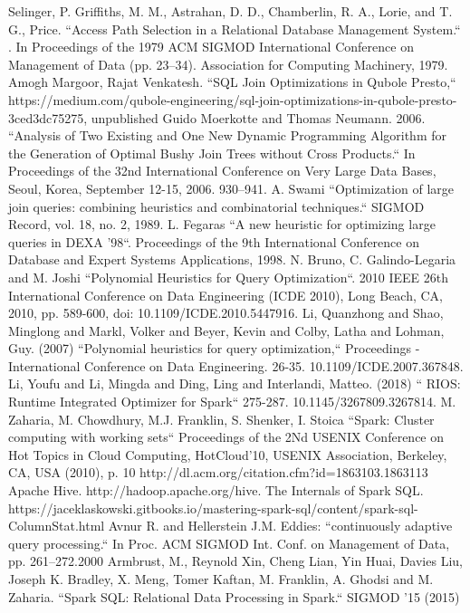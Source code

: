 \documentclass[conference]{IEEEtran}
\begin{document}
\begin{thebibliography}{00}
 Selinger, P. Griffiths, M. M., Astrahan, D. D., Chamberlin, R. A., Lorie, and T. G., Price. ``Access Path Selection in a Relational Database Management System.`` . In Proceedings of the 1979 ACM SIGMOD International Conference on Management of Data (pp. 23–34). Association for Computing Machinery, 1979.
 Amogh Margoor, Rajat Venkatesh. ``SQL Join Optimizations in Qubole Presto,``
https://medium.com/qubole-engineering/sql-join-optimizations-in-qubole-presto-3ced3dc75275, unpublished
 Guido Moerkotte and Thomas Neumann. 2006. ``Analysis of Two Existing and One New Dynamic Programming Algorithm for the Generation of Optimal Bushy Join Trees without Cross Products.`` In Proceedings of the 32nd International Conference on Very Large Data Bases, Seoul, Korea, September 12-15, 2006. 930–941.
 A. Swami ``Optimization of large join queries: combining heuristics and
combinatorial techniques.`` SIGMOD Record, vol. 18, no. 2, 1989.
 L. Fegaras ``A new heuristic for optimizing large queries in DEXA ’98``. Proceedings of the 9th International Conference on Database and Expert Systems Applications, 1998.
 N. Bruno, C. Galindo-Legaria and M. Joshi ``Polynomial Heuristics for Query Optimization``. 2010 IEEE 26th International Conference on Data Engineering (ICDE 2010), Long Beach, CA, 2010, pp. 589-600, doi: 10.1109/ICDE.2010.5447916.
 Li, Quanzhong and Shao, Minglong and Markl, Volker and Beyer, Kevin and Colby, Latha and Lohman, Guy. (2007)  ``Polynomial heuristics for query optimization,`` Proceedings - International Conference on Data Engineering. 26-35. 10.1109/ICDE.2007.367848.
 Li, Youfu and Li, Mingda and Ding, Ling and Interlandi, Matteo. (2018)  `` RIOS: Runtime Integrated Optimizer for Spark`` 275-287. 10.1145/3267809.3267814.
 M. Zaharia, M. Chowdhury, M.J. Franklin, S. Shenker, I. Stoica
``Spark: Cluster computing with working sets`` Proceedings of the 2Nd USENIX Conference on Hot Topics in Cloud Computing, HotCloud’10, USENIX Association, Berkeley, CA, USA (2010), p. 10 http://dl.acm.org/citation.cfm?id=1863103.1863113
 Apache Hive. http://hadoop.apache.org/hive.
 The Internals of Spark SQL. https://jaceklaskowski.gitbooks.io/mastering-spark-sql/content/spark-sql-ColumnStat.html
 Avnur R. and Hellerstein J.M. Eddies: ``continuously adaptive query processing.`` In Proc. ACM SIGMOD Int. Conf. on Management of Data, pp. 261–272.2000
 Armbrust, M., Reynold Xin, Cheng Lian, Yin Huai, Davies Liu, Joseph K. Bradley, X. Meng, Tomer Kaftan, M. Franklin, A. Ghodsi and M. Zaharia. ``Spark SQL: Relational Data Processing in Spark.`` SIGMOD '15 (2015)
\end{thebibliography}
\end{document}
